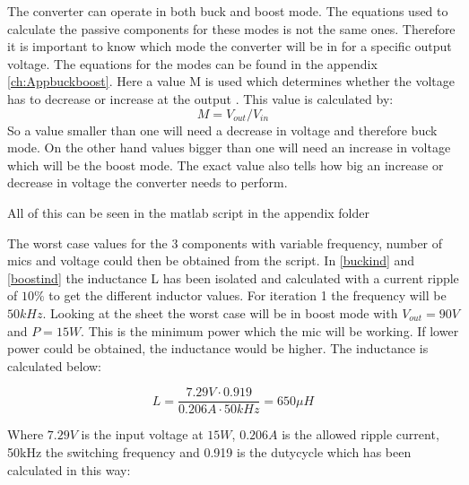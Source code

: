 The converter can operate in both buck and boost mode. The equations used to calculate the passive components for these modes is not the same ones. Therefore it is important to know which mode the converter will be in for a specific output voltage.  
The equations for the modes can be found in the appendix \ref{ch:Appbuckboost}. Here a value M is used which determines whether the voltage has to decrease or increase at the output . This value is calculated by:
\begin{equation}
M = V_{out}/V_{in}
\end{equation}
So a value smaller than one will need a decrease in voltage and therefore buck mode. On the other hand values bigger than one will need an increase in voltage which will be the boost mode. The exact value also tells how big an increase or decrease in voltage the converter needs to perform. 

All of this can be seen in the matlab script in the appendix folder  

The worst case values for the 3 components with variable frequency, number of mics and voltage could then be obtained from the script. 
In \ref{buckind} and \ref{boostind} the inductance L has been isolated and calculated with a current ripple of $10\%$ to get the different inductor values. For iteration 1 the frequency will be $50kHz$. Looking at the sheet the worst case will be in boost mode with $V_{out}=90V$ and $P=15W$. This is the minimum power which the mic will be working. If lower power could be obtained, the inductance would be higher. The inductance is calculated below:

\begin{equation}\label{buckind}
L = \frac{7.29V\cdot 0.919}{0.206A\cdot 50kHz} = 650\mu H
\end{equation} 

Where $7.29V$ is the input voltage at $15W$, $0.206A$ is the allowed ripple current, 50kHz the switching frequency and 0.919 is the dutycycle which has been calculated in this way:

